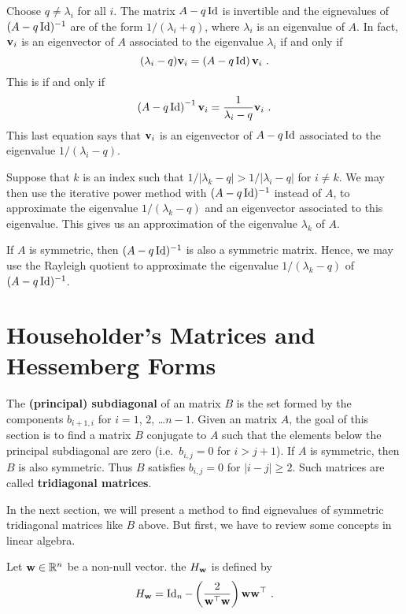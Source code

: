 Choose $q \neq \lambda_i$ for all $i$.  The matrix $A-q\operatorname{Id}$ is invertible and
the eignevalues of $(A-q\operatorname{Id})^{-1}$ are of the form
$\displaystyle 1/(\lambda_i + q)$, where $\lambda_i$ is an eigenvalue
of $A$.  In fact, $\mathbf{v}_i$ is an eigenvector of $A$ associated to the
eigenvalue $\lambda_i$ if and only if
\[
(\lambda_i-q) \mathbf{v}_i = \left(A-q\operatorname{Id}\right) \mathbf{v}_i \ .
\]
This is if and only if
\[
\left(A-q\operatorname{Id}\right)^{-1} \mathbf{v}_i = \frac{1}{\lambda_i-q} \mathbf{v}_i \ .
\]
This last equation says that $\mathbf{v}_i$ is an eigenvector of $A-q\operatorname{Id}$
associated to the eigenvalue $\displaystyle 1/(\lambda_i - q)$.

Suppose that $k$ is an index such that
$\displaystyle 1/|\lambda_k - q| > 1/|\lambda_i -q|$
for $i \neq k$.  We may then use the iterative power method with
$(A-q\operatorname{Id})^{-1}$ instead of $A$, to approximate the eigenvalue
$1/(\lambda_k - q)$ and an eigenvector associated to this eigenvalue.
This gives us an approximation of the eigenvalue $\lambda_k$ of $A$.

If $A$ is symmetric, then $(A-q\operatorname{Id})^{-1}$ is also a symmetric matrix.  Hence,
we may use the Rayleigh quotient to approximate the eigenvalue
$\displaystyle 1/(\lambda_k - q)$ of $(A-q\operatorname{Id})^{-1}$.

\section{Householder's Matrices and Hessemberg Forms}

The {\bfseries (principal) subdiagonal}
of an \nn matrix $B$ is
the set formed by the components $b_{i+1,i}$ for $i=1$, $2$, \ldots $n-1$.
Given an \nn matrix $A$, the goal of this section is to find a matrix $B$
conjugate to $A$ such that the elements below the principal subdiagonal are
zero  (i.e.\ $b_{i,j}=0$ for $i>j+1$).  If $A$ is symmetric, then $B$ is also
symmetric.  Thus $B$ satisfies $b_{i,j} = 0$ for $|i-j|\geq 2$.  Such
matrices are called
{\bfseries tridiagonal matrices}.

In the next section, we will present a method to find eignevalues of
symmetric tridiagonal matrices like $B$ above.  But first, we have to
review some concepts in linear algebra.

\begin{defn}
Let $\mathbf{w} \in \mathbb{R}^n$ be a non-null vector.  the
$H_{\mathbf{w}}$ is defined by
\[
H_{\mathbf{w}} = \operatorname{Id}_n - \left(\frac{2}{\mathbf{w}^\top \mathbf{w}}\right)
\mathbf{w} \mathbf{w}^\top \ .
\]
\end{defn}

